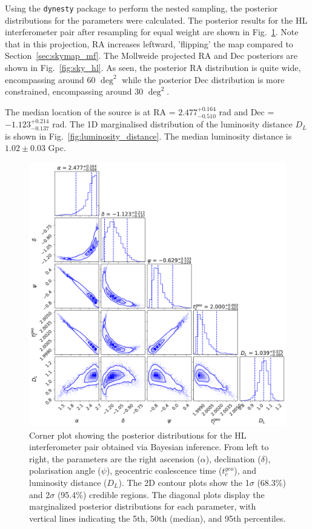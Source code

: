 \documentclass[11pt,a4paper]{article}
\begin{document}
Using the \texttt{dynesty} package to perform the nested sampling, the posterior distributions for the parameters were calculated. The posterior results for the HL interferometer pair after resampling for equal weight are shown in Fig.~\ref{fig:posterior_hl}. Note that in this projection, RA increases leftward, 'flipping' the map compared to Section~\ref{sec:skymap_mf}. The Mollweide projected RA and Dec posteriors are shown in Fig.~\ref{fig:sky_hl}. As seen, the posterior RA distribution is quite wide, encompassing around 60 ${\deg}^2$ while the posterior Dec distribution is more constrained, encompassing around 30 ${\deg}^2$. 

The median location of the source is at RA = $2.477^{+0.164}_{-0.510}$ rad and Dec = $-1.123^{+0.214}_{-0.137}$ rad. The 1D marginalised distribution of the luminosity distance $D_L$ is shown in Fig.~\ref{fig:luminosity_distance}. The median luminosity distance is $1.02 \pm 0.03$ Gpc.

\begin{figure}
    \includegraphics[width=\columnwidth, keepaspectratio]{../figures/corner_HL.png}
    \caption{Corner plot showing the posterior distributions for the HL interferometer pair obtained via Bayesian inference. From left to right, the parameters are the right ascension ($\alpha$), declination ($\delta$), polarisation angle ($\psi$), geocentric coalescence time ($t_c^{geo}$), and luminosity distance ($D_L$). The 2D contour plots show the 1$\sigma$ (68.3\%) and 2$\sigma$ (95.4\%) credible regions. The diagonal plots display the marginalized posterior distributions for each parameter, with vertical lines indicating the 5th, 50th (median), and 95th percentiles.}
    \label{fig:posterior_hl}
\end{figure}
\end{document}
